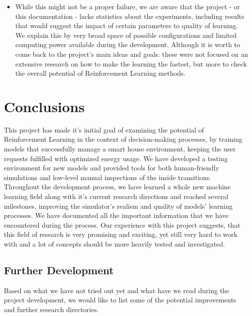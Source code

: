 \documentclass{article}
\begin{document}
\begin{itemize}
\item While this might not be a proper failure, we are aware that the project - or this documentation - lacks statistics about the experiments, including results that would suggest the impact of certain parameters to quality of learning. We explain this by very broad space of possible configurations and limited computing power available during the development. Although it is worth to come back to the project's main ideas and goals: these were not focused on an extensive research on how to make the learning the fastest, but more to check the overall potential of Reinforcement Learning methods. 
\end{itemize}

\section{Conclusions}

This project has made it's initial goal of examining the potential of Reinforcement Learning in the context of decision-making processes, by training models that successfully manage a smart house environment, keeping the user requests fulfilled with optimized energy usage. We have developed a testing environment for new models and provided tools for both human-friendly simulations and low-level manual inspections of the inside transitions. Throughout the development process, we have learned a whole new machine learning field along with it's current research directions and reached several milestones, improving the simulator's realism and quality of models' learning processes. We have documented all the important information that we have encountered during the process. Our experience with this project suggests, that this field of research is very promising and exciting, yet still very hard to work with and a lot of concepts should be more heavily tested and investigated.
\subsection{Further Development}
Based on what we have not tried out yet and what have we read during the project development, we would like to list some of the potential improvements and further research directories.
\end{document}
